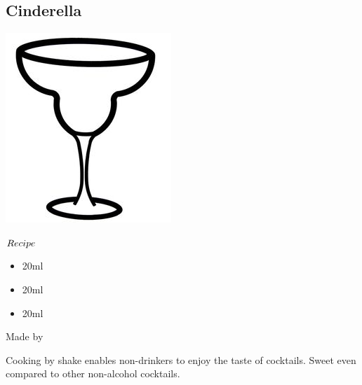 \subsection{Cinderella}
\vspace{-7mm}
\hspace{33mm}
\includegraphics[scale=.05]{cocktail_glass_snow.jpg}
\vspace{2.5mm}
\begin{itembox}[l]{\boldmath $Recipe$}
\begin{itemize}
\setlength{\parskip}{0cm}
\setlength{\itemsep}{0cm}
\item \oj 20ml
\item \pj 20ml
\item \lj 20ml
\end{itemize}
\vspace{-4mm}
Made by \shake
\end{itembox}
Cooking by shake enables non-drinkers to enjoy the taste of cocktails. Sweet even compared to other non-alcohol cocktails.
